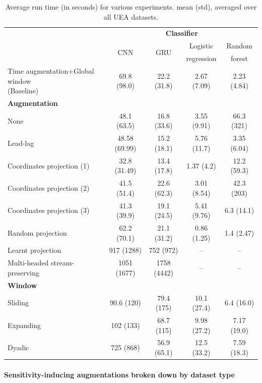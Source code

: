 \documentclass{article}
\theoremstyle{definition}
\theoremstyle{remark}
\begin{document}
	\begin{table}[h]
		\caption{Average run time (in seconds) for various experiments. mean (std), averaged over all UEA datasets.}
		\label{tab:average_run_time}
		\begin{tabular}{lcccc}
		\toprule
		&\multicolumn{4}{c}{\textbf{Classifier}} \\
		\cmidrule{2-5}
		 & \multirow{2}{*}{CNN} & \multirow{2}{*}{GRU} & Logistic  & Random \\
		 & & & regression & forest \\
		\midrule
		\parbox{51mm}{Time augmentation+Global window\\(Baseline)} & 69.8 (98.0) & 22.2 (31.8) & 2.67 (7.09) & 2.23 (4.84) \\
		\midrule
		\textbf{Augmentation} & & & \\
		None & 48.1 (63.5) & 16.8 (33.6) & 3.55 (9.91) & 66.3 (321) \\
		Lead-lag & 48.58 (69.99) & 15.2 (18.1) & 5.76 (11.7) & 3.35 (6.04) \\
		Coordinates projection (1) & 32.8 (31.49) & {13.4 (17.8) }& 1.37 (4.2) & 12.2 (59.3) \\
		Coordinates projection (2) & 41.5 (51.4) & 22.6 (62.3) & 3.01 (8.54) & 42.3 (203) \\
		Coordinates projection (3) & {41.3 (39.9)} & 19.1 (24.5) & 5.41 (9.76) & 6.3 (14.1) \\
		Random projection & 62.2 (70.1) & 21.1 (31.2) & {0.86 (1.25) }& {1.4 (2.47) }\\
		Learnt projection & 917 (1288) & 752 (972) & -- & -- \\
		Multi-headed stream-preserving & 1051 (1677) & 1758 (4442) & -- & -- \\
		\textbf{Window}  & & & \\
		Sliding & 90.6 (120) & 79.4 (175) & 10.1 (27.4) & 6.4 (16.0) \\
		Expanding & 102 (133) & 68.7 (115) & 9.98 (27.2) & 7.17 (19.0) \\
		Dyadic & 725 (868) & 56.9 (65.1) & 12.5 (33.2) & 7.59 (18.3) \\
		\bottomrule
		\end{tabular}
		\end{table}

	\paragraph{Sensitivity-inducing augmentations broken down by dataset type}
\end{document}
